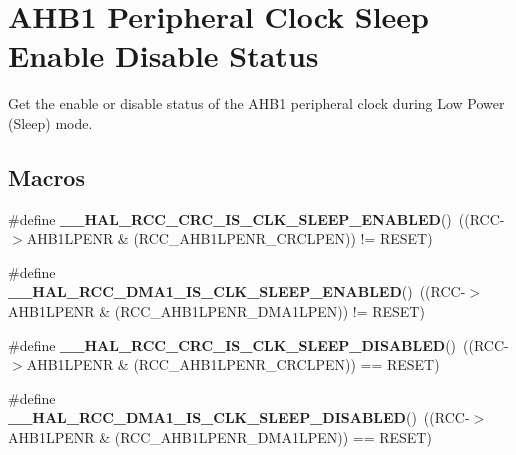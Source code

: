 \hypertarget{group___r_c_c___a_h_b1___clock___sleep___enable___disable___status}{}\section{A\+H\+B1 Peripheral Clock Sleep Enable Disable Status}
\label{group___r_c_c___a_h_b1___clock___sleep___enable___disable___status}


Get the enable or disable status of the A\+H\+B1 peripheral clock during Low Power (Sleep) mode.  


\subsection*{Macros}
\begin{DoxyCompactItemize}
\item 
\mbox{\label{group___r_c_c___a_h_b1___clock___sleep___enable___disable___status_ga1983077cf8fed9d77dbb4950a46a3b7e}} 
\#define {\bfseries \+\_\+\+\_\+\+H\+A\+L\+\_\+\+R\+C\+C\+\_\+\+C\+R\+C\+\_\+\+I\+S\+\_\+\+C\+L\+K\+\_\+\+S\+L\+E\+E\+P\+\_\+\+E\+N\+A\+B\+L\+ED}()~((R\+CC-\/$>$A\+H\+B1\+L\+P\+E\+NR \& (R\+C\+C\+\_\+\+A\+H\+B1\+L\+P\+E\+N\+R\+\_\+\+C\+R\+C\+L\+P\+EN)) != R\+E\+S\+ET)
\item 
\mbox{\label{group___r_c_c___a_h_b1___clock___sleep___enable___disable___status_ga2840d82c5565e7690a69a6848fa50fea}} 
\#define {\bfseries \+\_\+\+\_\+\+H\+A\+L\+\_\+\+R\+C\+C\+\_\+\+D\+M\+A1\+\_\+\+I\+S\+\_\+\+C\+L\+K\+\_\+\+S\+L\+E\+E\+P\+\_\+\+E\+N\+A\+B\+L\+ED}()~((R\+CC-\/$>$A\+H\+B1\+L\+P\+E\+NR \& (R\+C\+C\+\_\+\+A\+H\+B1\+L\+P\+E\+N\+R\+\_\+\+D\+M\+A1\+L\+P\+EN)) != R\+E\+S\+ET)
\item 
\mbox{\label{group___r_c_c___a_h_b1___clock___sleep___enable___disable___status_gacb97eeee02557f4c5a3afd480227dd1c}} 
\#define {\bfseries \+\_\+\+\_\+\+H\+A\+L\+\_\+\+R\+C\+C\+\_\+\+C\+R\+C\+\_\+\+I\+S\+\_\+\+C\+L\+K\+\_\+\+S\+L\+E\+E\+P\+\_\+\+D\+I\+S\+A\+B\+L\+ED}()~((R\+CC-\/$>$A\+H\+B1\+L\+P\+E\+NR \& (R\+C\+C\+\_\+\+A\+H\+B1\+L\+P\+E\+N\+R\+\_\+\+C\+R\+C\+L\+P\+EN)) == R\+E\+S\+ET)
\item 
\mbox{\label{group___r_c_c___a_h_b1___clock___sleep___enable___disable___status_gac5b14fe76c4661619636fcdf08e2a874}} 
\#define {\bfseries \+\_\+\+\_\+\+H\+A\+L\+\_\+\+R\+C\+C\+\_\+\+D\+M\+A1\+\_\+\+I\+S\+\_\+\+C\+L\+K\+\_\+\+S\+L\+E\+E\+P\+\_\+\+D\+I\+S\+A\+B\+L\+ED}()~((R\+CC-\/$>$A\+H\+B1\+L\+P\+E\+NR \& (R\+C\+C\+\_\+\+A\+H\+B1\+L\+P\+E\+N\+R\+\_\+\+D\+M\+A1\+L\+P\+EN)) == R\+E\+S\+ET)
\end{DoxyCompactItemize}


